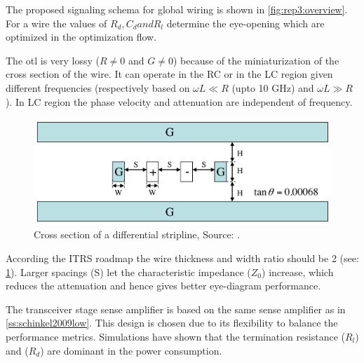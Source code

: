 \summary
The proposed signaling schema for global wiring is shown in \cref{fig:rep3:overview}.
For a wire the values of $R_{d}, C_{d} and R_{l}$ determine the eye-opening which are optimized in the optimization flow.

The \ac{otl} is very lossy ($R \neq 0$ and $G \neq 0$) because of the miniaturization of the cross section of the wire.
It can operate in the RC or in the LC region given different frequencies (respectively based on $\omega L \ll R$ (upto 10 GHz) and $\omega L \gg R$).
In LC region the phase velocity and attenuation are independent of frequency.

\begin{figure}
	\centering
	\includegraphics[width=0.95\linewidth]{Figures/Rep3TransmissionLine.png}
	\caption{Cross section of a differential stripline, Source: \cite{zhang2009high}.} 
    \label{fig:rep3:crosssection}
\end{figure}
According the ITRS roadmap the wire thickness and width ratio should be 2 (see: \cref{fig:rep3:crosssection}).
Larger spacings (S) let the characteristic impedance ($Z_{0}$) increase, which reduces the attenuation and hence gives better eye-diagram performance. %

The transceiver stage sense amplifier is based on the same sense amplifier as in \cref{ss:schinkel2009low}.
This design is chosen due to its flexibility to balance the performance metrics.
Simulations have shown that the termination resistance ($R_{l}$) and ($R_{d}$) are dominant in the power consumption.



